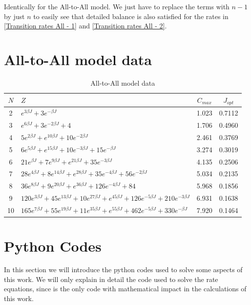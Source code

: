 Identically for the All-to-All model. We just have to replace the terms with $n-1$ by just $n$ to easily see that detailed balance is also satisfied for the rates in \eqref{Transition rates All - 1} and \eqref{Transition rates All - 2}.

\chapter{All-to-All model data}

\begin{table}[h]
    \centering
    \caption{All-to-All model data}
    \renewcommand{\arraystretch}{1.5}
    \begin{tabular}{|c|l|c|c|}
        \hline 
        $N$ & $Z$ & $C_{max}$ & $J_{opt}$ \\
        \hline
        2 & $e^{3 \beta J} + 3 e^{-\beta J}$ & 1.023 & 0.7112 \\
        \hline
        3 & $e^{6 \beta J} +3e^{-2 \beta J} + 4$ & 1.706 & 0.4960 \\
        \hline
        4 & $5 e^{2 \beta J} + e^{10 \beta J} + 10 e^{-2 \beta J}$ & 2.461 & 0.3769 \\
        \hline
        5 & $6 e^{5 \beta J} + e^{15 \beta J} + 10 e^{-3 \beta J} + 15 e^{-\beta J}$ & 3.274 & 0.3019 \\
        \hline
        6 & $21 e^{\beta J} + 7 e^{9\beta J} + e^{21\beta J} + 35 e^{-3\beta J}$ & 4.135 & 0.2506 \\
        \hline
        7 & $28 e^{4\beta J} + 8 e^{14\beta J} + e^{28\beta J} + 35 e^{-4\beta J} + 56 e^{-2\beta J}$ & 5.034 & 0.2135 \\
        \hline
        8 & $36 e^{8 \beta J} + 9 e^{20 \beta J} + e^{36 \beta J}  + 126 e^{-4 \beta J}+ 84$ & 5.968 & 0.1856 \\
        \hline
        9 & $120 e^{3 \beta J} + 45 e^{13 \beta J} + 10 e^{27 \beta J} + e^{45 \beta J} + 126 e^{-5 \beta J} + 210 e^{-3 \beta J}$ & 6.931 & 0.1638 \\
        \hline
        10 & $165 e^{7 \beta J} + 55 e^{19 \beta J} + 11 e^{35 \beta J} + e^{55 \beta J} + 462 e^{-5 \beta J} + 330 e^{-\beta J} $ & 7.920 & 0.1464 \\
        \hline
    \end{tabular}\label{All-To-All Data}
\end{table} 


\chapter{Python Codes}\label{Python Codes}
\setcounter{equation}{0}
\renewcommand{\theequation}{C.\arabic{equation}}
In this section we will introduce the python codes used to solve some aspects of this work. We will only explain in detail the code used to solve the rate equations, since is the only code with mathematical impact in the calculations of this work.

